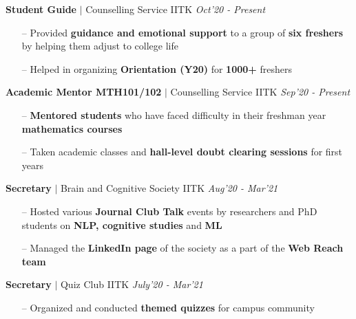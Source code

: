 \documentclass[9pt]{extarticle}
\begin{document}
\hspace{-2mm}\textbf{Student Guide} $|$ Counselling Service IITK
\hfill\hfill\textit{Oct'20 - Present}
\begin{itemize}
\item[--] Provided \textbf{guidance and emotional support} to a group of \textbf{six freshers} by helping them adjust to college life
\item[--] Helped in organizing \textbf{Orientation (Y20)} for \textbf{1000+} freshers
\end{itemize}
\vspace{2mm}

\hspace{-2mm}\textbf{Academic Mentor MTH101/102} $|$ Counselling Service IITK
\hfill\hfill\textit{Sep'20 - Present}
\begin{itemize}
\item[--] \textbf{Mentored students} who have faced difficulty in their freshman year \textbf{mathematics courses} 
\item[--] Taken academic classes and \textbf{hall-level doubt clearing sessions} for first years
\end{itemize}
\vspace{2mm}

\hspace{-2mm}\textbf{Secretary} $|$ Brain and Cognitive Society IITK
\hfill\hfill\textit{Aug'20 - Mar'21}
\begin{itemize}
\item[--] Hosted various \textbf{Journal Club Talk} events by researchers and PhD students on \textbf{NLP, cognitive studies} and \textbf{ML}
\item[--] Managed the \textbf{LinkedIn page} of the society as a part of the \textbf{Web Reach team}
\end{itemize}
\vspace{2mm}

\hspace{-2mm}\textbf{Secretary} $|$ Quiz Club IITK
\hfill\hfill\textit{July'20 - Mar'21}
\begin{itemize}
\item[--] Organized and conducted \textbf{themed quizzes} for campus community
\end{itemize}
\vspace{-2mm}
\end{document}

